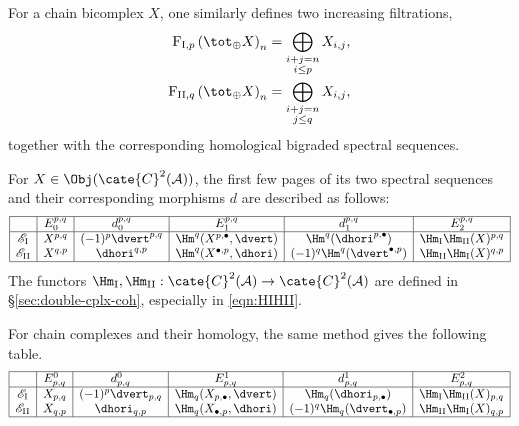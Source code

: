 For a chain bicomplex $X$, one similarly defines two increasing filtrations,
\begin{align*}
	\mathrm{F}_{\mathrm{I}, p} \left( \tot_{\oplus} X \right)_n & = \bigoplus_{\substack{i+j=n \\ i \leq p}} X_{i, j}, \\
	\mathrm{F}_{\mathrm{II}, q} \left( \tot_{\oplus} X \right)_n & = \bigoplus_{\substack{i+j=n \\ j \leq q}} X_{i, j},
\end{align*}
together with the corresponding homological bigraded spectral sequences.

\begin{proposition}\label{prop:double-cplx-ss}
	For $X\in\Obj(\cate{C}^2(\mathcal{A}))$, the first few pages of its two
	spectral sequences and their corresponding morphisms $d$ are described as
	follows:
	\[\begin{array}{|c|c|c|c|c|c|} \hline
		& E_0^{p,q} & d_0^{p,q} & E_1^{p,q} & d_1^{p,q} & E_2^{p,q} \\ \hline
		\mathscr{E}_{\mathrm{I}} & X^{p,q} & (-1)^p \dvert^{p,q} & \Hm^q(X^{p, \bullet}, \dvert) & \Hm^q(\dhori^{p, \bullet}) & \Hm_{\mathrm{I}}\Hm_{\mathrm{II}}(X)^{p,q} \\
		\mathscr{E}_{\mathrm{II}} & X^{q,p} & \dhori^{q,p} & \Hm^q(X^{\bullet, p}, \dhori) & (-1)^q \Hm^q(\dvert^{\bullet, p}) & \Hm_{\mathrm{II}} \Hm_{\mathrm{I}}(X)^{q,p} \\ \hline
	\end{array}\]
	The functors
	$\Hm_{\mathrm{I}},\Hm_{\mathrm{II}}:\cate{C}^2(\mathcal{A})
	\to\cate{C}^2(\mathcal{A})$ are defined in
	\S\ref{sec:double-cplx-coh}, especially in \eqref{eqn:HIHII}.

	For chain complexes and their homology, the same method gives the following
	table.
	\[\begin{array}{|c|c|c|c|c|c|} \hline
		& E^0_{p,q} & d^0_{p,q} & E^1_{p,q} & d^1_{p,q} & E^2_{p,q} \\ \hline
		\mathscr{E}_{\mathrm{I}} & X_{p,q} & (-1)^p \dvert_{p,q} & \Hm_q(X_{p, \bullet}, \dvert) & \Hm_q(\dhori_{p, \bullet}) & \Hm_{\mathrm{I}}\Hm_{\mathrm{II}}(X)_{p,q} \\
		\mathscr{E}_{\mathrm{II}} & X_{q,p} & \dhori_{q,p} & \Hm_q(X_{\bullet, p}, \dhori) & (-1)^q \Hm_q(\dvert_{\bullet, p}) & \Hm_{\mathrm{II}} \Hm_{\mathrm{I}}(X)_{q,p} \\ \hline
	\end{array}\]
\end{proposition}
